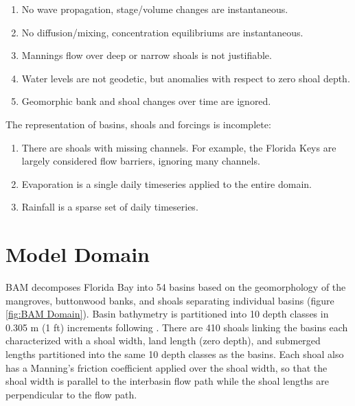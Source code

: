 \begin{enumerate}
  \itemsep-8pt
  \item No wave propagation, stage/volume changes are instantaneous.
  \item No diffusion/mixing, concentration equilibriums are instantaneous.
  \item Mannings flow over deep or narrow shoals is not justifiable.
  \item Water levels are not geodetic, but anomalies with respect to zero shoal depth. 
  \item Geomorphic bank and shoal changes over time are ignored.
\end{enumerate}

\vspace{12pt}
\noindent The representation of basins, shoals and forcings is incomplete:

\begin{enumerate}
  \itemsep-8pt
  \item There are shoals with missing channels. For example, the Florida Keys are largely considered flow barriers, ignoring many channels.
  \item Evaporation is a single daily timeseries applied to the entire domain.
  \item Rainfall is a sparse set of daily timeseries.
\end{enumerate}


\clearpage 
\section{Model Domain}
\label{sec:Model Domain}
BAM decomposes Florida Bay into 54 basins based on the geomorphology of the mangroves, buttonwood banks, and shoals separating individual basins (figure \ref{fig:BAM Domain}).  Basin bathymetry is partitioned into 10 depth classes in 0.305 m (1 ft) increments following \citet{Cosby2010}.  There are 410 shoals linking the basins each characterized with a shoal width, land length (zero depth), and submerged lengths partitioned into the same 10 depth classes as the basins. Each shoal also has a Manning's friction coefficient applied over the shoal width, so that the shoal width is parallel to the interbasin flow path while the shoal lengths are perpendicular to the flow path. 

